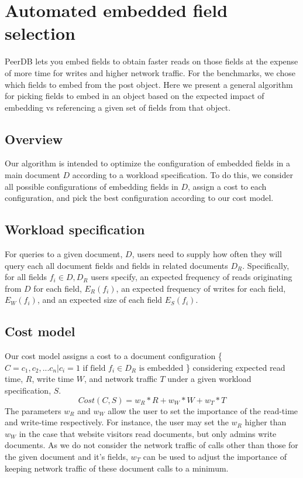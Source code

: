 \section{Automated embedded field selection}
PeerDB lets you embed fields to obtain faster reads on those fields at the expense of more time for writes and higher network traffic. For the benchmarks, we chose which fields to embed from the post object. Here we present a general algorithm for picking fields to embed in an object based on the expected impact of embedding vs referencing a given set of fields from that object. 

\subsection{Overview}
Our algorithm is intended to optimize the configuration of embedded fields in a main document $D$ according to a workload specification. To do this, we consider all possible configurations of embedding fields in $D$, assign a cost to each configuration, and pick the best configuration according to our cost model.

\subsection{Workload specification}
For queries to a given document, $D$, users need to supply how often they will query each all document fields and fields in related documents $D_R$. Specifically, for all fields $f_i \in D, D_R$ users specify, an expected frequency of reads originating from $D$ for each field, $E_R(f_i)$, an expected frequency of writes for each field, $E_W(f_i)$, and an expected size of each field $E_S(f_i)$. 

\subsection{Cost model}
Our cost model assigns a cost to a document configuration \{$C = c_1, c_2, ... c_n | c_i = 1 \text{ if field } f_i \in D_R \text{ is embedded }$\} considering expected read time, $R$, write time $W$, and network traffic $T$ under a given workload specification, $S$.
$$Cost(C,S) = w_R*R + w_W*W + w_T*T$$ 
The parameters $w_R$ and $w_W$ allow the user to set the importance of the read-time and write-time respectively. For instance, the user may set the $w_R$ higher than $w_W$ in the case that website visitors read documents, but only admins write documents. As we do not consider the network traffic of calls other than those for the given document and it's fields, $w_T$ can be used to adjust the importance of keeping network traffic of these document calls to a minimum. 

